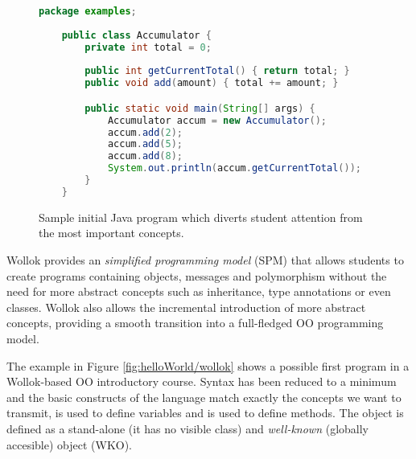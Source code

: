 \begin{figure}[ht]
\vspace{-3mm}
 \centering
 \begin{lstlisting}[language=Java]
	package examples;
	
	public class Accumulator {
		private int total = 0;
		
		public int getCurrentTotal() { return total; }
		public void add(amount) { total += amount; }

		public static void main(String[] args) {
			Accumulator accum = new Accumulator();
			accum.add(2);
			accum.add(5);
			accum.add(8);
			System.out.println(accum.getCurrentTotal());
		}
	}\end{lstlisting}
\vspace{-3mm}
\caption{Sample initial Java program which diverts student attention from the most important concepts.}
\label{fig:helloWorld}
\vspace{-3mm}
\end{figure}




Wollok provides an \emph{simplified programming model} (SPM)
that allows students to create programs containing objects, 
messages and polymorphism without the need for more abstract concepts 
such as inheritance, type annotations or even classes.
Wollok also allows the incremental introduction of more abstract concepts,
providing a smooth transition into a full-fledged OO programming model.

The example in Figure \ref{fig:helloWorld/wollok} 
shows a possible first program in a Wollok-based OO introductory course.
Syntax has been reduced to a minimum and the basic constructs of the language match exactly the concepts we want to transmit, \eg {} is used to define variables and  is used to define methods.
The  object is defined 
as a stand-alone (\ie it has no visible class)
and \emph{well-known} (\ie globally accesible) object (WKO).

